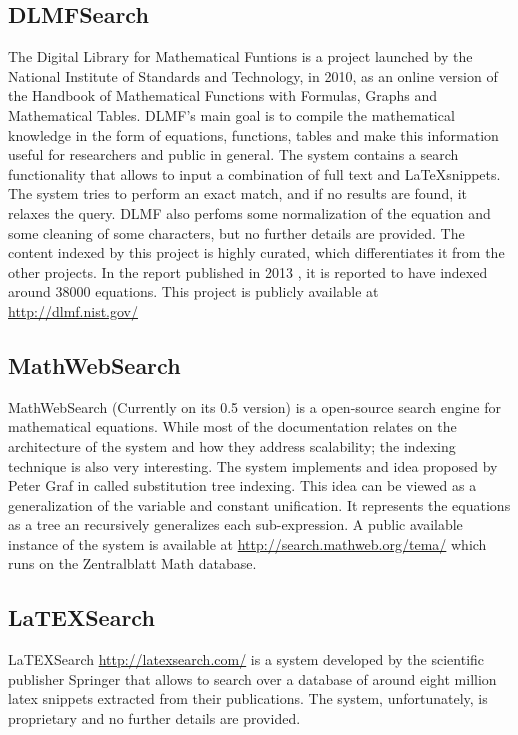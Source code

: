 \subsection{DLMFSearch}
The Digital Library for Mathematical Funtions \cite{dlmf} is a project launched by the National Institute of Standards and Technology, in 2010, as an online version of the  Handbook of Mathematical Functions with Formulas, Graphs and Mathematical Tables\cite{handbook}. DLMF's main goal is to compile the mathematical knowledge in the form of equations, functions, tables and make this information useful for researchers and public in general. The system contains a search functionality that allows to input a combination of full text and \LaTeX snippets. The system tries to perform an exact match, and if no results are found, it relaxes the query. DLMF also perfoms some normalization of the equation and some cleaning of some characters, but no further details are provided. The content indexed by this project is highly curated, which differentiates it from the other projects. In the report published in 2013 \cite{dlmf2}, it is reported to have indexed around 38000 equations. This project is publicly available at \url{http://dlmf.nist.gov/}

\subsection{MathWebSearch}
MathWebSearch\cite{mathwebsearch} (Currently on its 0.5 version) is a open-source search engine for mathematical equations. While most of the documentation relates on the architecture of the system and how they address scalability; the indexing technique is also very interesting. The system implements and idea proposed by Peter Graf in \cite{substitution_tree_indexing} called substitution tree indexing. This idea can be viewed as a generalization of the variable and constant unification. It represents the equations as a tree an recursively generalizes each sub-expression. A public available instance of the system is available at \url{http://search.mathweb.org/tema/} which runs on the Zentralblatt Math database\cite{zb}.


\subsection{LaTEXSearch}
LaTEXSearch \url{http://latexsearch.com/} is a system developed by the scientific publisher Springer that allows to search over a database of around eight million latex snippets extracted from their publications. The system, unfortunately, is proprietary and no further details are provided.

